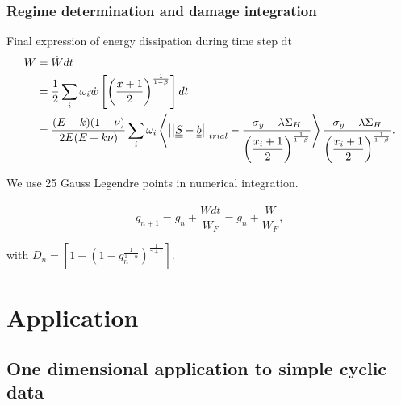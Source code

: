 \documentclass[xcolor=table]{Bredelebeamer}
\begin{document}
\begin{frame}
	\frametitle{Regime determination and damage integration}
	\begin{block}{Final expression of energy dissipation during time step dt }	
	\begin{equation}
	\begin{split}
	W&=\dot{W}dt
	\\&=\frac{1}{2}\sum_{i}\omega_i\dot{w}\left[  \left( \frac{x+1}{2}\right) ^{\frac{1}{1-\beta}}\right]dt
	\\&=\dfrac{(E-k)(1+\nu) }{2E(E+k\nu)}\sum_{i}\omega_i\left\langle  \left| \left|\uline{\uline{S}}-\uline{\uline{b}}\right| \right|_{trial}-\dfrac{\sigma_y-\lambda \Sigma_H}{\left( \dfrac{x_i+1}{2}\right) ^{\frac{1}{1-\beta}}}\right\rangle \dfrac{\sigma_y-\lambda \Sigma_H}{\left( \dfrac{x_i+1}{2}\right) ^{\frac{1}{1-\beta}}}.
	\end{split}
	\label{finaldw}
	\end{equation}
	\end{block}
We use 25 Gauss Legendre points in numerical integration.

$$g_{n+1}=g_n+\dfrac{\dot{W}dt}{W_F}=g_n+\dfrac{W}{W_F},$$

with $D_n=\left[1-\left(1-g_n^{\frac{1}{1-\alpha}} \right)^{\frac{1}{\gamma+1}}  \right] $.

\end{frame}	

\section{Application}
\subsection{One dimensional application to simple cyclic data}
\end{document}

